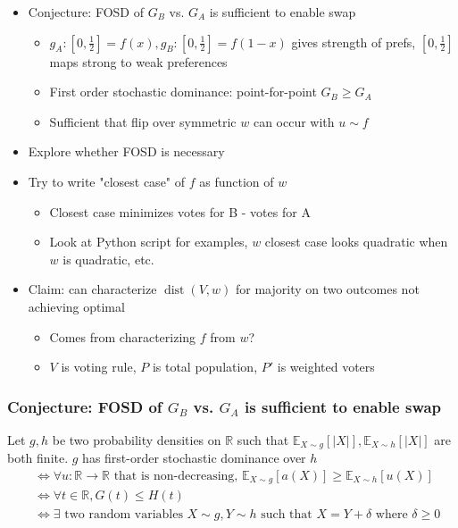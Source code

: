 \documentclass[12pt]{article}
\begin{document}
\begin{itemize}[nolistsep]
    \item Conjecture: FOSD of $G_B$ vs. $G_A$ is sufficient to enable swap
        \begin{itemize}[nolistsep]
            \item $g_A: [0, \frac{1}{2}] = f(x), g_B: [0, \frac{1}{2}] = f(1 - x)$ gives strength of prefs, $[0, \frac{1}{2}]$ maps strong to weak preferences 
            \item First order stochastic dominance: point-for-point $G_B \geq G_A$
            \item Sufficient that flip over symmetric $w$ can occur with $u \sim f$
        \end{itemize}
    \item Explore whether FOSD is necessary
    \item Try to write "closest case" of $f$ as function of $w$
        \begin{itemize}[nolistsep]
            \item Closest case minimizes votes for B - votes for A
            \item Look at Python script for examples, $w$ closest case looks quadratic when $w$ is quadratic, etc.
        \end{itemize}
    \item Claim: can characterize $\operatorname{dist}(V, w)$ for majority on two outcomes not achieving optimal
        \begin{itemize}[nolistsep]
            \item Comes from characterizing $f$ from $w$?
            \item $V$ is voting rule, $P$ is total population, $P'$ is weighted voters
        \end{itemize}
\end{itemize}

\subsubsection*{Conjecture: FOSD of $G_B$ vs. $G_A$ is sufficient to enable swap}

\begin{definition}
Let $g, h$ be two probability densities on $\mathbb{R}$ such that $\mathbb{E}_{X \sim g}[\lvert X \rvert], \mathbb{E}_{X \sim h}[\lvert X \rvert]$ are both finite. $g$ has first-order stochastic dominance over $h$ 
\begin{align*}
    &\iff \forall u: \mathbb{R} \to \mathbb{R}\text{ that is non-decreasing, }\mathbb{E}_{X \sim g}[a(X)] \geq \mathbb{E}_{X \sim h}[u(X)] \\
    &\iff \forall t \in \mathbb{R}, G(t) \leq H(t) \\
    &\iff \exists\text{ two random variables }X \sim g, Y \sim h\text{ such that }X = Y + \delta\text{ where }\delta \geq 0
\end{align*}
\end{definition}
\end{document}
